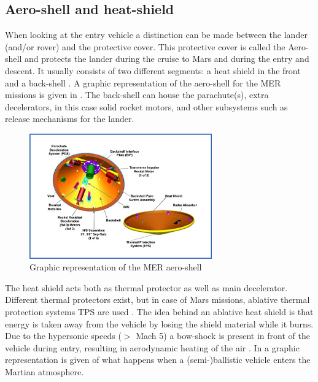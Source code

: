 \subsection{Aero-shell and heat-shield}
\label{subsec:heatshield}
When looking at the entry vehicle a distinction can be made between the lander (and/or rover) and the protective cover. This protective cover is called the Aero-shell and protects the lander during the cruise to Mars and during the entry and descent. It usually consists of two different segments: a heat shield in the front and a back-shell \cite{viotti2015}. A graphic representation of the aero-shell for the MER missions is given in . The back-shell can house the parachute(s), extra decelerators, in this case solid rocket motors, and other subsystems such as release mechanisms for the lander.

\begin{figure}[!ht]
\centering
\includegraphics[width=0.7\textwidth]{figures/entry_descent/mer_aeroshell_viotti2015.jpg}
\caption{Graphic representation of the MER aero-shell \cite{viotti2015}}
\label{fig:mer_aeroshell_viotti2015}
\end{figure}

The heat shield acts both as thermal protector as well as main decelerator. Different thermal protectors exist, but in case of Mars missions, ablative thermal protection systems \acs{TPS} are used \cite{braun2006,viotti2015}. The idea behind an ablative heat shield is that energy is taken away from the vehicle by losing the shield material while it burns. Due to the hypersonic speeds ($>$ Mach 5) a bow-shock is present in front of the vehicle during entry, resulting in aerodynamic heating of the air \cite{mooij2013entry}. In  a graphic representation is given of what happens when a (semi-)ballistic vehicle enters the Martian atmosphere. 

